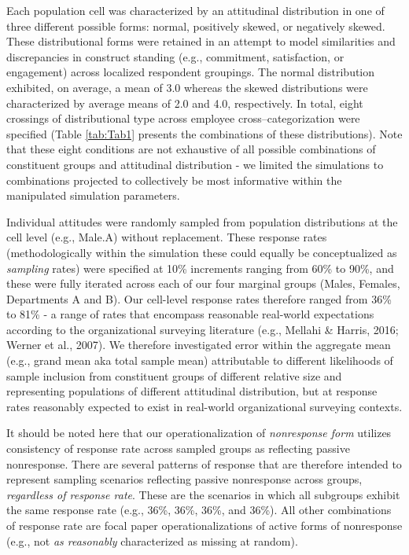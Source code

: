 \documentclass[
  man,mask]{apa7}
\begin{document}
Each population cell was characterized by an attitudinal distribution in one of three different possible forms: normal, positively skewed, or negatively skewed. These distributional forms were retained in an attempt to model similarities and discrepancies in construct standing (e.g., commitment, satisfaction, or engagement) across localized respondent groupings. The normal distribution exhibited, on average, a mean of 3.0 whereas the skewed distributions were characterized by average means of 2.0 and 4.0, respectively. In total, eight crossings of distributional type across employee cross--categorization were specified (Table \ref{tab:Tab1} presents the combinations of these distributions). Note that these eight conditions are not exhaustive of all possible combinations of constituent groups and attitudinal distribution - we limited the simulations to combinations projected to collectively be most informative within the manipulated simulation parameters.

Individual attitudes were randomly sampled from population distributions at the cell level (e.g., Male.A) without replacement. These response rates (methodologically within the simulation these could equally be conceptualized as \emph{sampling} rates) were specified at 10\% increments ranging from 60\% to 90\%, and these were fully iterated across each of our four marginal groups (Males, Females, Departments A and B). Our cell-level response rates therefore ranged from 36\% to 81\% - a range of rates that encompass reasonable real-world expectations according to the organizational surveying literature (e.g., Mellahi \& Harris, 2016; Werner et al., 2007). We therefore investigated error within the aggregate mean (e.g., grand mean aka total sample mean) attributable to different likelihoods of sample inclusion from constituent groups of different relative size and representing populations of different attitudinal distribution, but at response rates reasonably expected to exist in real-world organizational surveying contexts.

It should be noted here that our operationalization of \emph{nonresponse form} utilizes consistency of response rate across sampled groups as reflecting passive nonresponse. There are several patterns of response that are therefore intended to represent sampling scenarios reflecting passive nonresponse across groups, \emph{regardless of response rate}. These are the scenarios in which all subgroups exhibit the same response rate (e.g., 36\%, 36\%, 36\%, and 36\%). All other combinations of response rate are focal paper operationalizations of active forms of nonresponse (e.g., not \emph{as reasonably} characterized as missing at random).
\end{document}
